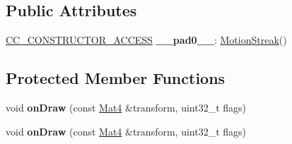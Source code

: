 \subsection*{Public Attributes}
\begin{DoxyCompactItemize}
\item 
\mbox{\label{classMotionStreak_a313822d6bd07ae0bf95a224b69d62e10}} 
\hyperlink{_2cocos2d_2cocos_2base_2ccConfig_8h_a25ef1314f97c35a2ed3d029b0ead6da0}{C\+C\+\_\+\+C\+O\+N\+S\+T\+R\+U\+C\+T\+O\+R\+\_\+\+A\+C\+C\+E\+SS} {\bfseries \+\_\+\+\_\+pad0\+\_\+\+\_\+}\+: \hyperlink{classMotionStreak}{Motion\+Streak}()
\end{DoxyCompactItemize}
\subsection*{Protected Member Functions}
\begin{DoxyCompactItemize}
\item 
\mbox{\label{classMotionStreak_a929f48fc26ea114687ffc8d8db5a10c4}} 
void {\bfseries on\+Draw} (const \hyperlink{classMat4}{Mat4} \&transform, uint32\+\_\+t flags)
\item 
\mbox{\label{classMotionStreak_a929f48fc26ea114687ffc8d8db5a10c4}} 
void {\bfseries on\+Draw} (const \hyperlink{classMat4}{Mat4} \&transform, uint32\+\_\+t flags)
\end{DoxyCompactItemize}
